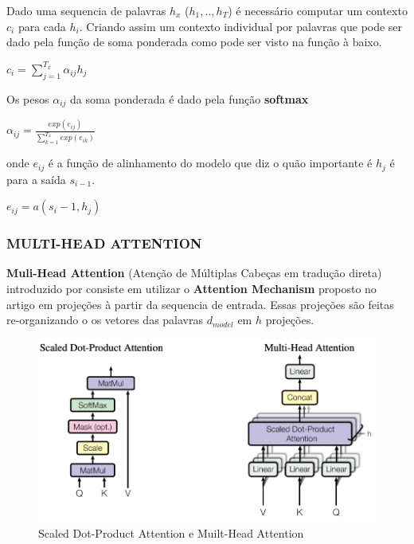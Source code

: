 Dado uma sequencia de palavras $h_x$ ($h_1, .., h_T$) é necessário computar um contexto $c_i$ para cada $h_i$. Criando assim um contexto individual por palavras que pode ser dado pela função de soma ponderada como pode ser visto na função à baixo.

\begin{center}\large
    $c_i = \sum_{j=1}^{T_x} \alpha_{ij} h_j$
\end{center}

Os pesos $\alpha_{ij}$ da soma ponderada é dado pela função \textbf{softmax}

\begin{center}\large
    $\alpha_{ij} = \frac{exp(e_{ij})}{\sum_{k=1}^{T_x} exp(e_{ik})}$
\end{center}

onde $e_{ij}$ é a função de alinhamento do modelo que diz o quão importante é $h_j$ é para a saída $s_{i-1}$.

\begin{center}\large
    $e_{ij} = a(s_i-1, h_j)$
\end{center}

\subsubsection{MULTI-HEAD ATTENTION}

\textbf{Muli-Head Attention} (Atenção de Múltiplas Cabeças em tradução direta) introduzido por \cite{transformer} consiste em utilizar o \textbf{Attention Mechanism} proposto no artigo \cite{attention} em projeções à partir da sequencia de entrada. Essas projeções são feitas re-organizando o os vetores das palavras $d_{model}$ em $h$ projeções.

\begin{figure}[h]
	\caption{\label{attention_muilt_head} Scaled Dot-Product Attention e Muilt-Head Attention}
	\begin{center}
	    \includegraphics[width=\textwidth]{artigo/recursos/imagens/attention_muilt_head.png}
	\end{center}
\end{figure}


